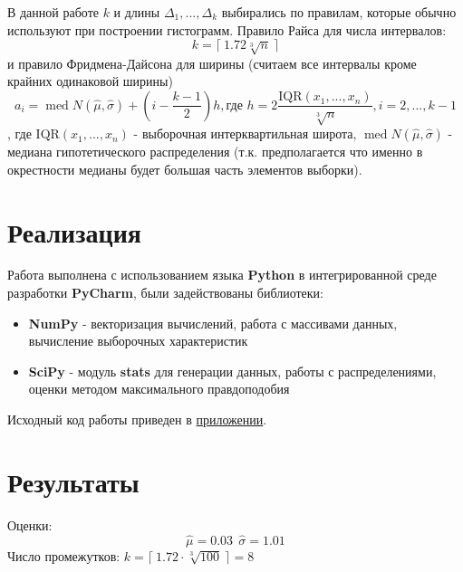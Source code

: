 \documentclass[12pt,a4paper]{article}
\DeclareMathOperator{\med}{med}
\begin{document}
В данной работе $k$ и длины $\Delta_1, ..., \Delta_k$ выбирались по правилам, которые обычно используют при построении гистограмм\cite{histogram}. Правило Райса для числа интервалов:
\begin{equation}
	k = \lceil \ 1.72\sqrt[3]{n} \ \rceil 
\end{equation}
и правило Фридмена-Дайсона для ширины (считаем все интервалы кроме крайних одинаковой ширины)
\begin{equation}
	a_i = \med{N(\widehat{\mu}, \widehat{\sigma})} + \left(i - \frac{k-1}{2}\right) h, \text{где } h = 2 \frac{\text{IQR} (x_1, ..., x_n)}{\sqrt[3]{n}}, i = 2, ..., k-1
\end{equation}
, где $\text{IQR}(x_1, ..., x_n)$ - выборочная интерквартильная широта, $\med{N(\widehat{\mu}, \widehat{\sigma})}$ - медиана гипотетического распределения (т.к. предполагается что именно в окрестности медианы будет большая часть элементов выборки).
\pagebreak

\section{Реализация}
\label{sec:impl}
Работа выполнена с использованием языка \textbf{Python} в интегрированной среде разработки \textbf{PyCharm}, были задействованы библиотеки:

\begin{itemize}
	\item \textbf{NumPy} - векторизация вычислений, работа с массивами данных, вычисление выборочных характеристик
	\item \textbf{SciPy} - модуль \textbf{stats} для генерации данных, работы с распределениями, оценки методом максимального правдоподобия
\end{itemize}

Исходный код работы приведен в \hyperref[sec:appl]{приложении}. 
\pagebreak

\section{Результаты}
Оценки: 
\begin{equation}\label{lab7:1}
	\widehat{\mu} = 0.03 \ \ \widehat{\sigma} = 1.01
\end{equation}
Число промежутков: $k = \lceil \ 1.72 \cdot \sqrt[3]{100} \ \rceil = 8$ \\ 
\end{document}
